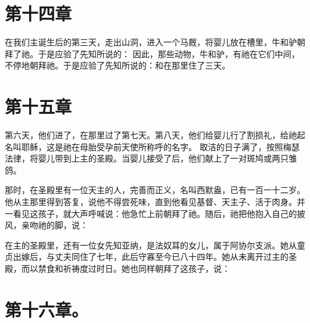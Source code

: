 \section{第十四章}

在我们主诞生后的第三天，走出山洞，进入一个马厩，将婴儿放在槽里，牛和驴朝拜了祂。于是应验了先知所说的： 因此，那些动物，牛和驴，有祂在它们中间，不停地朝拜祂。于是应验了先知所说的：和在那里住了三天。\par


\section{第十五章}

第六天，他们进了，在那里过了第七天。第八天，他们给婴儿行了割损礼，给祂起名叫耶稣，这是祂在母胎受孕前天使所称呼的名字。 取洁的日子满了，按照梅瑟法律，将婴儿带到上主的圣殿。当婴儿接受了后，他们献上了一对斑鸠或两只雏鸽。\par

那时，在圣殿里有一位天主的人，完善而正义，名叫西默盎，已有一百一十二岁。他从主那里得到答复，说他不得尝死味，直到他看见基督、天主子、活于肉身。并一看见这孩子，就大声呼喊说：他急忙上前朝拜了祂。随后，祂把他抱入自己的披风，亲吻祂的脚，说：\par

在主的圣殿里，还有一位女先知亚纳，是法奴耳的女儿，属于阿协尔支派。她从童贞出嫁后，与丈夫同住了七年，此后守寡至今已八十四年。她从未离开过主的圣殿，而以禁食和祈祷度过时日。她也同样朝拜了这孩子，说：\par


\section{第十六章。}

